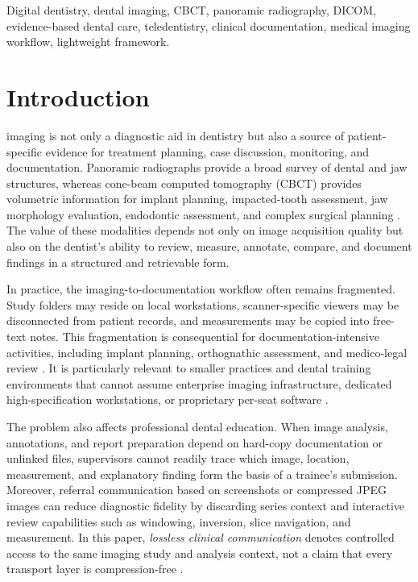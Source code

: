 \documentclass[journal]{IEEEtran}
\begin{document}
\begin{IEEEkeywords}
Digital dentistry, dental imaging, CBCT, panoramic radiography, DICOM, evidence-based dental care, teledentistry, clinical documentation, medical imaging workflow, lightweight framework.
\end{IEEEkeywords}

\section{Introduction}
\label{sec:introduction}

 imaging is not only a diagnostic aid in dentistry but also a source of patient-specific evidence for treatment planning, case discussion, monitoring, and documentation. Panoramic radiographs provide a broad survey of dental and jaw structures, whereas cone-beam computed tomography (CBCT) provides volumetric information for implant planning, impacted-tooth assessment, jaw morphology evaluation, endodontic assessment, and complex surgical planning \cite{ref:scarfe2008,ref:demagalhaes2025}. The value of these modalities depends not only on image acquisition quality but also on the dentist's ability to review, measure, annotate, compare, and document findings in a structured and retrievable form.

In practice, the imaging-to-documentation workflow often remains fragmented. Study folders may reside on local workstations, scanner-specific viewers may be disconnected from patient records, and measurements may be copied into free-text notes. This fragmentation is consequential for documentation-intensive activities, including implant planning, orthognathic assessment, and medico-legal review \cite{ref:rahim2025,ref:li2022,ref:schwendicke2025}. It is particularly relevant to smaller practices and dental training environments that cannot assume enterprise imaging infrastructure, dedicated high-specification workstations, or proprietary per-seat software \cite{ref:fahim2022,ref:nascimento2023,ref:owolabi2022}.

The problem also affects professional dental education. When image analysis, annotations, and report preparation depend on hard-copy documentation or unlinked files, supervisors cannot readily trace which image, location, measurement, and explanatory finding form the basis of a trainee's submission. Moreover, referral communication based on screenshots or compressed JPEG images can reduce diagnostic fidelity by discarding series context and interactive review capabilities such as windowing, inversion, slice navigation, and measurement. In this paper, \emph{lossless clinical communication} denotes controlled access to the same imaging study and analysis context, not a claim that every transport layer is compression-free \cite{ref:talla2024,ref:nemeth2023}.
\end{document}
